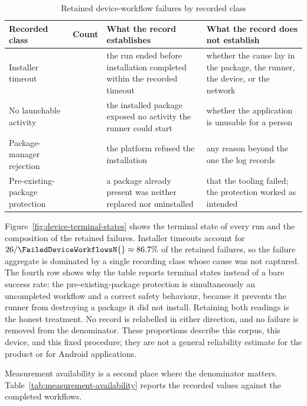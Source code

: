 \begin{table}[H]
\centering
\caption{Retained device-workflow failures by recorded class}
\label{tab:device-failures}
\scriptsize
\setlength{\tabcolsep}{4pt}
\begin{tabular}{>{\raggedright\arraybackslash}p{}>{\raggedright\arraybackslash}p{}>{\raggedright\arraybackslash}p{}>{\raggedright\arraybackslash}p{}}
\toprule
Recorded class & Count & What the record establishes & What the record does not establish \\
\midrule
Installer timeout & 26 & the run ended before installation completed within the recorded timeout & whether the cause lay in the package, the runner, the device, or the network \\
No launchable activity & 2 & the installed package exposed no activity the runner could start & whether the application is unusable for a person \\
Package-manager rejection & 1 & the platform refused the installation & any reason beyond the one the log records \\
Pre-existing-package protection & 1 & a package already present was neither replaced nor uninstalled & that the tooling failed; the protection worked as intended \\
\bottomrule
\end{tabular}
\end{table}

Figure~\ref{fig:device-terminal-states} shows the terminal state of every run and the composition of the retained failures. Installer timeouts account for $26/\FailedDeviceWorkflowsN{}\approx86.7\%$ of the retained failures, so the failure aggregate is dominated by a single recording class whose cause was not captured. The fourth row shows why the table reports terminal states instead of a bare success rate: the pre-existing-package protection is simultaneously an uncompleted workflow and a correct safety behaviour, because it prevents the runner from destroying a package it did not install. Retaining both readings is the honest treatment. No record is relabelled in either direction, and no failure is removed from the denominator. These proportions describe this corpus, this device, and this fixed procedure; they are not a general reliability estimate for the product or for Android applications.

Measurement availability is a second place where the denominator matters. Table~\ref{tab:measurement-availability} reports the recorded values against the completed workflows.


